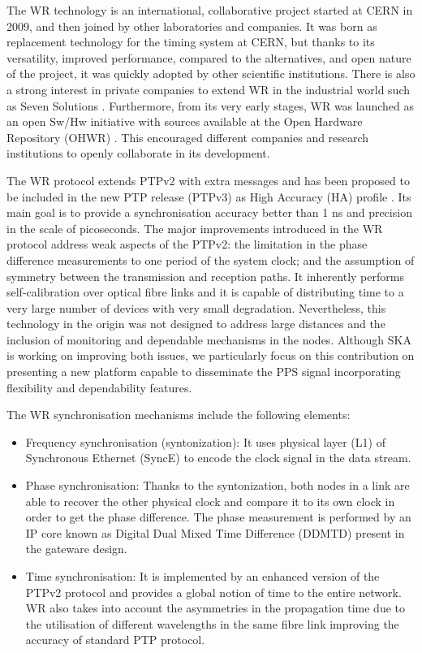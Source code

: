 The WR technology \cite{Wlostowski2011} is an international, collaborative
project started at CERN in 2009, and then joined by other laboratories and
companies. It was born as replacement technology for the timing system at CERN,
but thanks to its versatility, improved performance, compared to the
alternatives, and open nature of the project, it was quickly adopted by other
scientific institutions. There is also a strong interest in private companies to
extend WR in the industrial world such as Seven Solutions \cite{sevensols:wr}.
Furthermore, from its very early stages, WR was launched as an open Sw/Hw
initiative with sources available at the Open Hardware Repository (OHWR)
\cite{ohwr:repo}. This encouraged different companies and research institutions
to openly collaborate in its development.

The WR protocol extends PTPv2 with extra messages and has been proposed to be
included in the new PTP release (PTPv3) as High Accuracy (HA) profile
\cite{wr:maciej-ptpv3-standard} . Its main goal is to provide a synchronisation
accuracy better than 1 ns and precision in the scale of picoseconds. The major
improvements introduced in the WR protocol address weak aspects of the PTPv2:
the limitation in the phase difference measurements to one period of the system
clock; and the assumption of symmetry between the transmission and reception
paths. It inherently performs self-calibration over optical fibre links and it
is capable of distributing time to a very large number of devices with very
small degradation. Nevertheless, this technology in the origin was not designed
to address large distances and the inclusion of monitoring and dependable
mechanisms in the nodes. Although SKA is working on improving both issues, we
particularly focus on this contribution on presenting a new platform capable to
disseminate the PPS signal incorporating flexibility and dependability features.  

The WR synchronisation mechanisms include the following elements:

\begin{itemize} \item {Frequency synchronisation (syntonization): It uses
		physical layer (L1) of Synchronous Ethernet (SyncE) to encode
	the clock signal in the data stream. } \item {Phase synchronisation:
		Thanks to the syntonization, both nodes in a link are able to
		recover the other physical clock and compare it to its own clock
		in order to get the phase difference. The phase measurement is
		performed by an IP core known as Digital Dual Mixed Time
		Difference (DDMTD) present in the gateware design.} \item {Time
			synchronisation: It is implemented by an enhanced
			version of the PTPv2 protocol and provides a global
			notion of time to the entire network. WR also takes into
			account the asymmetries in the propagation time due to
			the utilisation of different wavelengths in the same
			fibre link improving the accuracy of standard PTP
			protocol.} \end{itemize}

